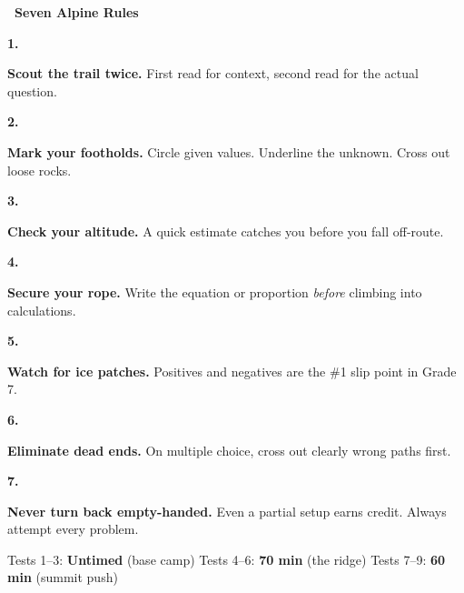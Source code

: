 {\vspace{2mm}

\noindent\textcolor{alpSlate}{\large\bfseries\faFlag~Seven Alpine Rules}

\vspace{2mm}

\newcommand{\alpineRule}[3]{%
    \noindent
    \begin{minipage}[t]{0.06\linewidth}
        \centering
        \textcolor{#2}{\fontsize{16}{16}\selectfont\bfseries #1.}
    \end{minipage}%
    \begin{minipage}[t]{0.92\linewidth}
        \small #3
    \end{minipage}
    \vspace{2mm}
}

\alpineRule{1}{alpPine}{%
    \textbf{Scout the trail twice.} First read for context, second read for the actual question.
}
\alpineRule{2}{alpSunrise!90!black}{%
    \textbf{Mark your footholds.} Circle given values. Underline the unknown. Cross out loose rocks.
}
\alpineRule{3}{alpCrimson}{%
    \textbf{Check your altitude.} A quick estimate catches you before you fall off-route.
}
\alpineRule{4}{alpPine}{%
    \textbf{Secure your rope.} Write the equation or proportion \textit{before} climbing into calculations.
}
\alpineRule{5}{alpSunrise!90!black}{%
    \textbf{Watch for ice patches.} Positives and negatives are the \#1 slip point in Grade 7.
}
\alpineRule{6}{alpCrimson}{%
    \textbf{Eliminate dead ends.} On multiple choice, cross out clearly wrong paths first.
}
\alpineRule{7}{alpSlate}{%
    \textbf{Never turn back empty-handed.} Even a partial setup earns credit. Always attempt every problem.
}

\vspace{2mm}

\begin{tcolorbox}[
    enhanced,
    colback=alpIce!15,
    colframe=alpSlate!30,
    arc=4pt, boxrule=0.8pt,
    left=5mm, right=5mm, top=3mm, bottom=3mm,
    title={\small\textcolor{white}{\faClock~Altitude Clock}},
    colbacktitle=alpSlate!65,
    fonttitle=\bfseries\sffamily,
    borderline west={3pt}{0pt}{alpSlate!40},
]
    \small\centering
    Tests 1--3: \textbf{Untimed} (base camp)
    \quad\textcolor{alpSlate!40}{\faAngleRight}\quad
    Tests 4--6: \textbf{70 min} (the ridge)
    \quad\textcolor{alpSlate!40}{\faAngleRight}\quad
    Tests 7--9: \textbf{60 min} (summit push)
\end{tcolorbox}

}
